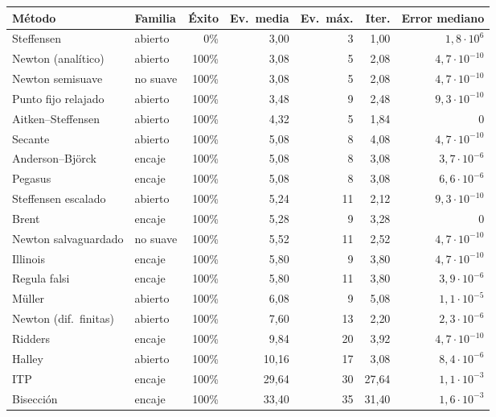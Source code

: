 \begin{tabular}{@{}llrrrrr@{}}
\toprule
\textbf{Método} & \textbf{Familia} & \textbf{Éxito} & \textbf{Ev.\ media} & \textbf{Ev.\ máx.} & \textbf{Iter.} & \textbf{Error mediano} \\
\midrule
Steffensen & abierto & 0\% & 3{,}00 & 3 & 1{,}00 & $1{,}8\cdot10^{6}$ \\
Newton (analítico) & abierto & 100\% & 3{,}08 & 5 & 2{,}08 & $4{,}7\cdot10^{-10}$ \\
Newton semisuave & no suave & 100\% & 3{,}08 & 5 & 2{,}08 & $4{,}7\cdot10^{-10}$ \\
Punto fijo relajado & abierto & 100\% & 3{,}48 & 9 & 2{,}48 & $9{,}3\cdot10^{-10}$ \\
Aitken--Steffensen & abierto & 100\% & 4{,}32 & 5 & 1{,}84 & $0$ \\
Secante & abierto & 100\% & 5{,}08 & 8 & 4{,}08 & $4{,}7\cdot10^{-10}$ \\
Anderson--Björck & encaje & 100\% & 5{,}08 & 8 & 3{,}08 & $3{,}7\cdot10^{-6}$ \\
Pegasus & encaje & 100\% & 5{,}08 & 8 & 3{,}08 & $6{,}6\cdot10^{-6}$ \\
Steffensen escalado & abierto & 100\% & 5{,}24 & 11 & 2{,}12 & $9{,}3\cdot10^{-10}$ \\
Brent & encaje & 100\% & 5{,}28 & 9 & 3{,}28 & $0$ \\
Newton salvaguardado & no suave & 100\% & 5{,}52 & 11 & 2{,}52 & $4{,}7\cdot10^{-10}$ \\
Illinois & encaje & 100\% & 5{,}80 & 9 & 3{,}80 & $4{,}7\cdot10^{-10}$ \\
Regula falsi & encaje & 100\% & 5{,}80 & 11 & 3{,}80 & $3{,}9\cdot10^{-6}$ \\
Müller & abierto & 100\% & 6{,}08 & 9 & 5{,}08 & $1{,}1\cdot10^{-5}$ \\
Newton (dif.\ finitas) & abierto & 100\% & 7{,}60 & 13 & 2{,}20 & $2{,}3\cdot10^{-6}$ \\
Ridders & encaje & 100\% & 9{,}84 & 20 & 3{,}92 & $4{,}7\cdot10^{-10}$ \\
Halley & abierto & 100\% & 10{,}16 & 17 & 3{,}08 & $8{,}4\cdot10^{-6}$ \\
ITP & encaje & 100\% & 29{,}64 & 30 & 27{,}64 & $1{,}1\cdot10^{-3}$ \\
Bisección & encaje & 100\% & 33{,}40 & 35 & 31{,}40 & $1{,}6\cdot10^{-3}$ \\
\bottomrule
\end{tabular}